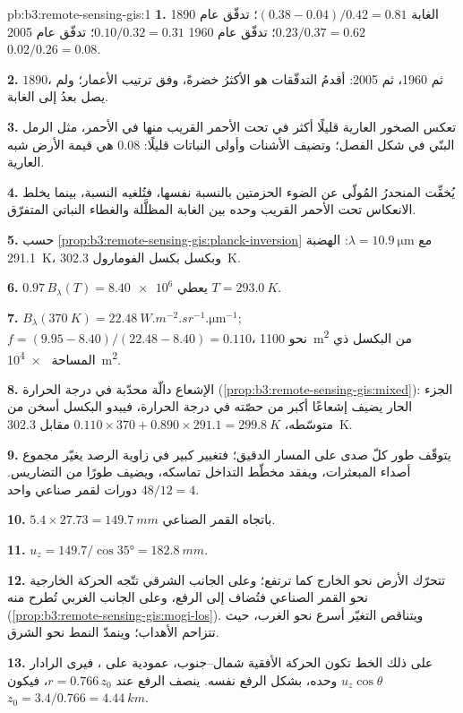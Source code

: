 \begin{solution}{pb:b3:remote-sensing-gis:1}
\textbf{1.} الغابة $(0.38 - 0.04)/0.42 = 0.81$؛ تدفّق عام 1890 $0.23/0.37 =
0.62$؛ تدفّق عام 1960 $0.10/0.32 = 0.31$؛ تدفّق عام 2005 $0.02/0.26 = 0.08$.

\textbf{2.} $1890$، ثم 1960، ثم 2005: أقدمُ التدفّقات هو الأكثرُ خضرةً،
وفق ترتيب الأعمار؛ ولم يصل بعدُ إلى الغابة.

\textbf{3.} تعكس الصخور العارية قليلًا أكثر في تحت الأحمر القريب منها في
الأحمر، مثل الرمل البنّي في شكل الفصل؛ وتضيف الأشنات وأولى النباتات
قليلًا: 0.08 هي قيمة الأرض شبه العارية.

\textbf{4.} يُخفِّت المنحدرُ المُولّى عن الضوء الحزمتين بالنسبة نفسها،
فتُلغيه النسبة، بينما يخلط الانعكاس تحت الأحمر القريب وحده
بين الغابة المظلَّلة والغطاء النباتي المتفرّق.

\textbf{5.} حسب \cref{prop:b3:remote-sensing-gis:planck-inversion} مع
$\lambda = \qty{10.9}{\micro\metre}$: الهضبة \qty{291.1}{K}، وبكسل
بكسل الفومارول \qty{302.3}{K}.

\textbf{6.} $0.97\,B_\lambda(T) = \num{8.40e6}$ يعطي $T = \qty{293.0}{K}$.

\textbf{7.} $B_\lambda(\qty{370}{K}) =
\qty{22.48}{W.m^{-2}.sr^{-1}.\micro\metre^{-1}}$; $f = (9.95 - 8.40)/(22.48
- 8.40) = 0.110$، نحو \qty{1100}{m^2} من البكسل ذي المساحة \qty{e4}{m^2}.

\textbf{8.} الإشعاع دالّة محدّبة في درجة الحرارة
(\cref{prop:b3:remote-sensing-gis:mixed}): الجزء الحار يضيف إشعاعًا أكبر
من حصّته في درجة الحرارة، فيبدو البكسل أسخن من متوسّطه،
$0.110\times370 + 0.890\times291.1 = \qty{299.8}{K}$ مقابل
\qty{302.3}{K}.

\textbf{9.} يتوقّف طور كلّ صدى على المسار الدقيق؛ فتغيير كبير في زاوية الرصد
يغيّر مجموع أصداء المبعثرات، ويفقد
مخطّط التداخل تماسكه، ويضيف طورًا من التضاريس.
$48/12 = 4$ دورات لقمر صناعي واحد.

\textbf{10.} $5.4\times27.73 = \qty{149.7}{mm}$ باتجاه القمر الصناعي.

\textbf{11.} $u_z = 149.7/\cos\ang{35} = \qty{182.8}{mm}$.

\textbf{12.} تتحرّك الأرض نحو الخارج كما ترتفع؛ وعلى الجانب الشرقي
تتّجه الحركة الخارجية نحو القمر الصناعي فتُضاف إلى الرفع، وعلى الجانب الغربي
تُطرح منه (\cref{prop:b3:remote-sensing-gis:mogi-los}). ويتناقص التغيّر
أسرع نحو الغرب، حيث تتزاحم الأهداب؛ وينمدّ النمط
نحو الشرق.

\textbf{13.} على ذلك الخط تكون الحركة الأفقية شمال--جنوب،
عمودية على ، فيرى الرادار $u_z\cos\theta$ وحده، بشكل
الرفع نفسه. ينصف الرفع عند $r = 0.766\,z_0$، فيكون $z_0 =
3.4/0.766 = \qty{4.44}{km}$.


\end{solution}
